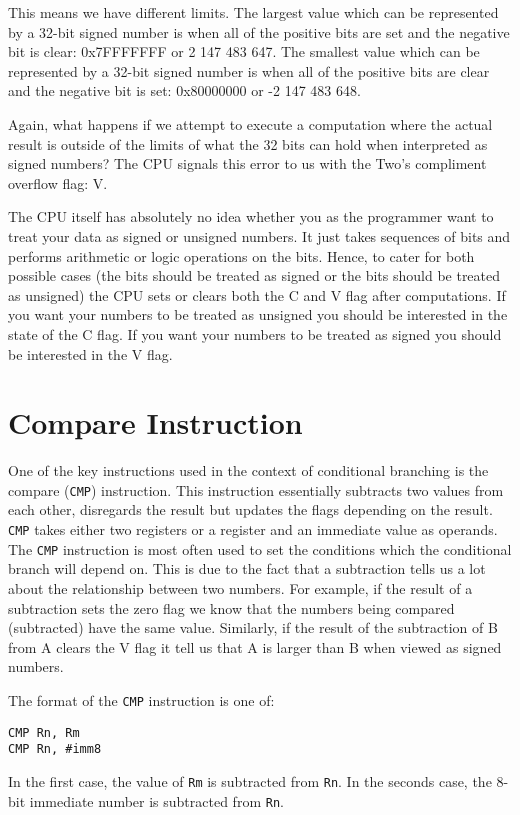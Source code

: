 This means we have different limits. The largest value which can be represented by a 32-bit signed number is when all of the positive bits are set and the negative bit is clear: 0x7FFFFFFF or 2 147 483 647. The smallest value which can be represented by a 32-bit signed number is when all of the positive bits are clear and the negative bit is set: 0x80000000 or -2 147 483 648.

Again, what happens if we attempt to execute a computation where the actual result is outside of the limits of what the 32 bits can hold when interpreted as signed numbers? The CPU signals this error to us with the Two's compliment overflow flag: V. 

The CPU itself has absolutely no idea whether you as the programmer want to treat your data as signed or unsigned numbers. It just takes sequences of bits and performs arithmetic or logic operations on the bits. Hence, to cater for both possible cases (the bits should be treated as signed or the bits should be treated as unsigned) the CPU sets or clears both the C and V flag after computations. If you want your numbers to be treated as unsigned you should be interested in the state of the C flag. If you want your numbers to be treated as signed you should be interested in the V flag. 

\section{Compare Instruction}
One of the key instructions used in the context of conditional branching is the compare (\texttt{CMP}) instruction. This instruction essentially subtracts two values from each other, disregards the result but updates the flags depending on the result. \texttt{CMP} takes either two registers or a register and an immediate value as operands. The \texttt{CMP} instruction is most often used to set the conditions which the conditional branch will depend on. This is due to the fact that a subtraction tells us a lot about the relationship between two numbers. For example, if the result of a subtraction sets the zero flag we know that the numbers being compared (subtracted) have the same value. Similarly, if the result of the subtraction of B from A clears the V flag it tell us that A is larger than B when viewed as signed numbers. 

The format of the \texttt{CMP} instruction is one of:
\begin{lstlisting}[fontadjust=true,frame=trBL]
CMP Rn, Rm
CMP Rn, #imm8
\end{lstlisting}
In the first case, the value of \texttt{Rm} is subtracted from \texttt{Rn}. In the seconds case, the 8-bit immediate number is subtracted from \texttt{Rn}.

